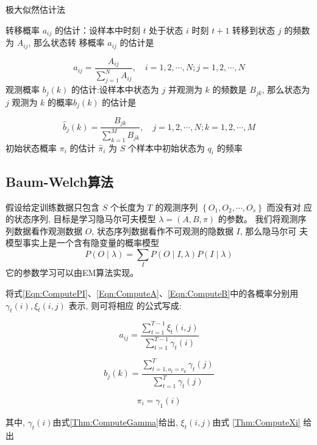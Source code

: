 \begin{algorithm}[htbp]
    \caption{极大似然估计法}
    

    转移概率 $ a_{i j} $ 的估计：设样本中时刻 $ t $ 处于状态 $ i $ 时刻 $ t+1 $ 转移到状态 $ j $ 的频数为 $ A_{i j} $, 那么状态转 移概率 $ a_{i j} $ 的估计是
    
    $$ \hat{a}_{i j}=\frac{A_{i j}}{\sum_{j=1}^{N} A_{i j}}, \quad i=1,2, \cdots, N ; j=1,2, \cdots, N $$
    \;
    观测概率 $ b_{j}(k) $ 的估计:设样本中状态为 $ j $ 并观测为 $ k $ 的频数是 $ B_{j k} $, 那么状态为 $ j $ 观测为 $ k $ 的概率$ b_{j}(k) $ 的估计是

    $$
    \hat{b}_{j}(k)=\frac{B_{j k}}{\sum_{k=1}^{M} B_{j k}}, \quad j=1,2, \cdots, N ; k=1,2, \cdots, M
    $$\;
    初始状态概率 $ \pi_{i} $ 的估计 $ \hat{\pi}_{i} $ 为 $ S $ 个样本中初始状态为 $ q_{i} $ 的频率\;

\end{algorithm}

\subsection{Baum-Welch算法}

假设给定训练数据只包含 $ S $ 个长度为 $ T $ 的观测序列 $ \left\{O_{1}, O_{2}, \cdots, O_{s}\right\} $ 而没有对 应的状态序列, 目标是学习隐马尔可夫模型 $ \lambda=(A, B, \pi) $ 的参数。 我们将观测序列数据看作观测数据 $ O $, 状态序列数据看作不可观测的隐数据 $ I $, 那么隐马尔可 夫模型事实上是一个含有隐变量的概率模型
$$
P(O \mid \lambda)=\sum_{I} P(O \mid I, \lambda) P(I \mid \lambda)
$$
它的参数学习可以由EM算法实现。 

\begin{theorem}
    将式\ref{Eqn:ComputePI}、\ref{Eqn:ComputeA}、\ref{Eqn:ComputeB}中的各概率分别用 $ \gamma_{t}(i), \xi_{t}(i, j) $ 表示, 则可将相应 的公式写成:

    $$ a_{i j}=\frac{\sum_{t=1}^{T-1} \xi_{t}(i, j)}{\sum_{t=1}^{T-1} \gamma_{t}(i)} $$

    $$ b_{j}(k)=\frac{\sum_{t=1, o_{t}=v_{k}}^{T} \gamma_{t}(j)}{\sum_{t=1}^{T} \gamma_{t}(j)} $$

    $$ \pi_{i}=\gamma_{1}(i) $$

    其中, $ \gamma_{t}(i)$由式\ref{Thm:ComputeGamma}给出, $\xi_{t}(i, j) $由式 \ref{Thm:ComputeXi} 给出
\end{theorem}


